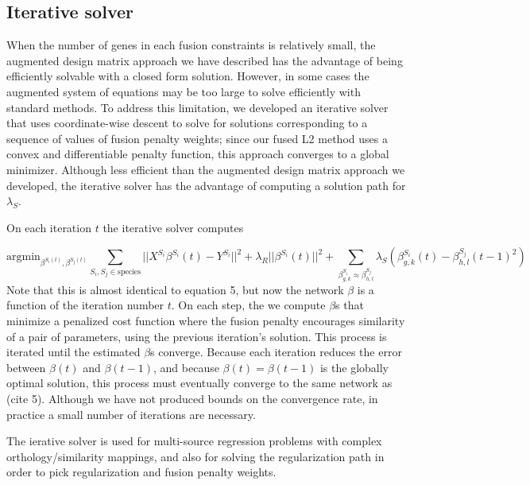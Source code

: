 \documentclass[11pt]{article}
\begin{document}
\subsection{Iterative solver}

When the number of genes in each fusion constraints is relatively small, the augmented design matrix approach we have described has the advantage of being efficiently solvable with a closed form solution. However, in some cases the augmented system of equations may be too large to solve efficiently with standard methods. To address this limitation, we developed an iterative solver that uses coordinate-wise descent to solve for solutions corresponding to a sequence of values of fusion penalty weights; since our fused L2 method uses a convex and differentiable penalty function, this approach converges to a global minimizer. Although less efficient than the augmented design matrix approach we developed, the iterative solver has the advantage of computing a solution path for $\lambda_S$.

On each iteration $t$ the iterative solver computes


\begin{equation}
\text{argmin}_{\beta^{S_i(t)}, \beta^{S_j(t)}} \displaystyle\sum_{S_i, S_j \in \text{species}} ||X^{S_i}\beta^{S_i}(t) - Y^{S_i}||^2 + \lambda_R||\beta^{S_i}(t)||^2 + \displaystyle \sum_{\beta_{g,k}^{S_i} \approx \beta_{h,l}^{S_j}} \lambda_S(\beta^{S_i}_{g,k}(t) - \beta_{h,l}^{S_j}(t-1)^2)
\end{equation}
Note that this is almost identical to equation 5, but now the network $\beta$ is a function of the iteration number $t$. On each step, the we compute $\beta$s that minimize a penalized cost function where the fusion penalty encourages similarity of a pair of parameters, using the previous iteration's solution. This process is iterated until the estimated $\beta$s converge. Because each iteration reduces the error between $\beta(t)$ and $\beta(t-1)$, and because $\beta(t) = \beta(t-1)$ is the globally optimal solution, this process must eventually converge to the same network as (cite 5). Although we have not produced bounds on the convergence rate, in practice a small number of iterations are necessary.

The ierative solver is used for multi-source regression problems with complex orthology/similarity mappings, and also for solving the regularization path in order to pick regularization and fusion penalty weights. 
\end{document}
